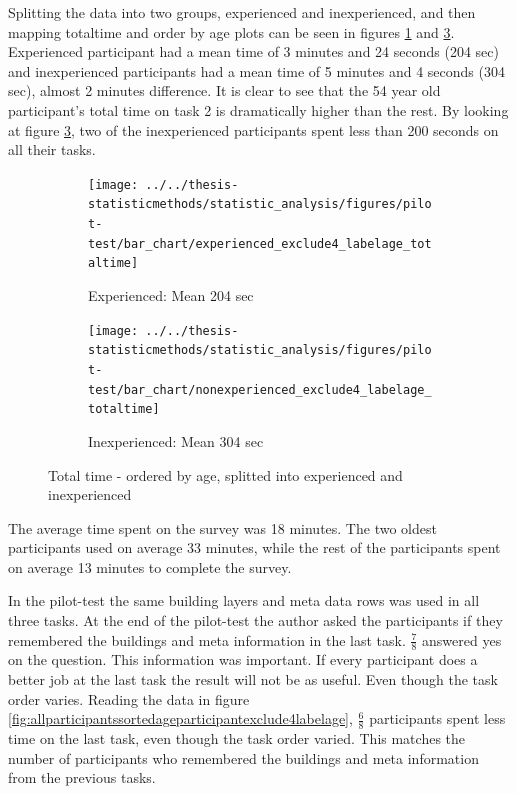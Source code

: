 Splitting the data into two groups, experienced and inexperienced, and then mapping totaltime and order by age plots can be seen in figures \ref{fig:experiencedexclude4labelagetotaltime} and \ref{fig:nonexperiencedexclude4labelagetotaltime}. Experienced participant had a mean time of 3 minutes and 24 seconds (204 sec) and inexperienced participants had a mean time of 5 minutes and 4 seconds (304 sec), almost 2 minutes difference. It is clear to see that the 54 year old participant's total time on task 2 is dramatically higher than the rest. By looking at figure \ref{fig:nonexperiencedexclude4labelagetotaltime}, two of the inexperienced participants spent less than 200 seconds on all their tasks.  

\begin{figure}[H]
	\centering
	\begin{subfigure}[b]{0.45\textwidth}
		\centering
		\texttt{[image: ../../thesis-statisticmethods/statistic\_analysis/figures/pilot-test/bar\_chart/experienced\_exclude4\_labelage\_totaltime]}
		\caption{Experienced: Mean 204 sec}
		\label{fig:experiencedexclude4labelagetotaltime}
	\end{subfigure}
	\begin{subfigure}[b]{0.45\textwidth}
		\centering
		\texttt{[image: ../../thesis-statisticmethods/statistic\_analysis/figures/pilot-test/bar\_chart/nonexperienced\_exclude4\_labelage\_totaltime]}
		\caption{Inexperienced: Mean 304 sec}
		\label{fig:nonexperiencedexclude4labelagetotaltime}
	\end{subfigure}
	\caption[Total time, sorted]{Total time - ordered by age, splitted into experienced and inexperienced}
\end{figure}

The average time spent on the survey was 18 minutes. The two oldest participants used on average 33 minutes, while the rest of the participants spent on average 13 minutes to complete the survey. 

In the pilot-test the same building layers and meta data rows was used in all three tasks. At the end of the pilot-test the author asked the participants if they remembered the buildings and meta information in the last task. $\frac{7}{8}$ answered yes on the question. This information was important. If every participant does a better job at the last task the result will not be as useful. Even though the task order varies. Reading the data in figure \ref{fig:allparticipantssortedageparticipantexclude4labelage}, $\frac{6}{8}$ participants spent less time on the last task, even though the task order varied. This matches the number of participants who remembered the buildings and meta information from the previous tasks.

